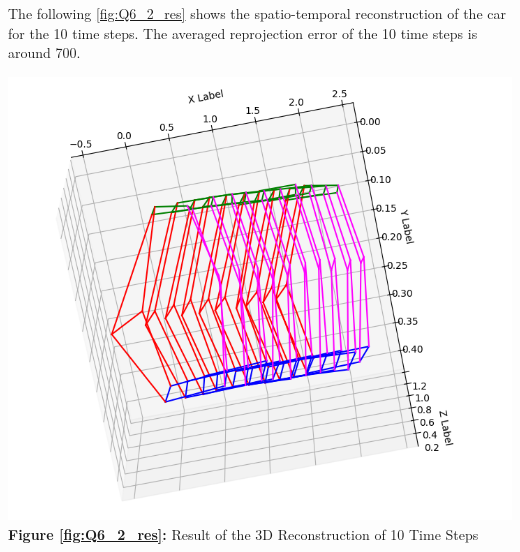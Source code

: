 \begin{your_solution}[title=Q6.2,height=15.5cm,width=\linewidth]
	The following \autoref{fig:Q6_2_res} shows the spatio-temporal reconstruction of the car for the 10 time steps.	The averaged reprojection error of the 10 time steps is around 700.
	\newline
	
\begin{minipage}{1\linewidth}
	\centering
	\includegraphics[width=0.8\linewidth, height=0.8\columnwidth]{../Q6_2_res.png}
	\newline
	\textbf{Figure \ref{fig:Q6_2_res}:}  Result of the 3D Reconstruction of 10 Time Steps
	\label{fig:Q6_2_res}         %
\end{minipage}	
\end{your_solution}
